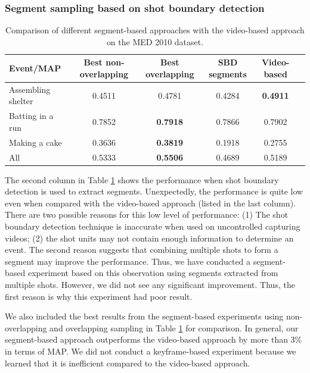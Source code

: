 \subsubsection{Segment sampling based on shot boundary detection}
\label{experimentalresult:3}
\begin{table}
	\renewcommand{\arraystretch}{1.3}
	\caption{Comparison of different segment-based approaches with the video-based approach on the MED 2010 dataset.}
	\label{t_med10_comparison}
	\centering
	\begin{tabular}{|l|ccc|c|c|}
		\hline
		Event/MAP & Best non-overlapping & Best overlapping & SBD segments & Video-based\\
		\hline
		Assembling shelter & 0.4511 & 0.4781& 0.4284  & \textbf{0.4911} \\
		\hline
		Batting in a run & 0.7852 &\textbf{0.7918}& 0.7866 & 0.7902 \\
		\hline
		Making a cake & 0.3636 & \textbf{0.3819} & 0.1918 & 0.2755 \\
		\hline
		All & 0.5333 & \textbf{0.5506} & 0.4689 & 0.5189 \\
		\hline
	\end{tabular}
\end{table}

The second column in Table \ref{t_med10_comparison} shows the performance when shot boundary detection is used to extract segments. Unexpectedly, the performance is quite low even when compared with the video-based approach (listed in the last column). There are two possible reasons for this low level of performance: (1) The shot boundary detection technique is inaccurate when used on uncontrolled capturing videos; (2) the shot units may not contain enough information to determine an event. The second reason suggests that combining multiple shots to form a segment may improve the performance. Thus, we have conducted a segment-based experiment based on this observation using segments extracted from multiple shots. However, we did not see any significant improvement. Thus, the first reason is why this experiment had poor result.

We also included the best results from the segment-based experiments using non-overlapping and overlapping sampling in Table \ref{t_med10_comparison} for comparison. In general, our segment-based approach outperforms the video-based approach by more than 3\% in terms of MAP. We did not conduct a keyframe-based experiment because we learned that it is inefficient compared to the video-based approach.

